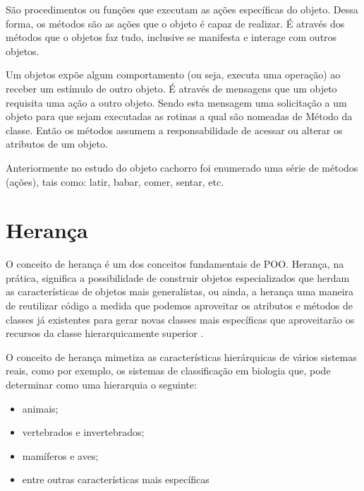 São procedimentos ou funções que executam as ações específicas do objeto. 
Dessa forma, os métodos são as ações que o objeto é capaz de realizar. É 
através dos métodos que o objetos faz tudo, inclusive se manifesta e 
interage com outros objetos.

Um objetos expõe algum comportamento (ou seja, executa uma operação) ao 
receber um estímulo de outro objeto. É através de mensagens que um objeto 
requisita uma ação a outro objeto. Sendo esta mensagem uma solicitação a um 
objeto para que sejam executadas as rotinas a qual são nomeadas de Método da 
classe. Então os métodos assumem a responsabilidade de acessar ou alterar os 
atributos de um objeto.

Anteriormente no estudo do objeto cachorro foi enumerado uma série de métodos 
(ações), tais como: latir, babar, comer, sentar, etc.

\section{Herança}

O conceito de herança é um dos conceitos fundamentais de POO. Herança, na prática, significa a possibilidade de construir objetos especializados que herdam as características de objetos mais generalistas, ou ainda, a herança uma maneira de reutilizar código a medida que podemos aproveitar os atributos e métodos de classes já existentes para gerar novas classes mais específicas que aproveitarão os recursos da classe hierarquicamente superior \cite{evandroeduardoseronruiz2008}.

O conceito de herança mimetiza as características hierárquicas de vários sistemas reais, como por exemplo, os sistemas de classificação em biologia que, pode determinar como uma hierarquia o seguinte:

\begin{itemize}
    \item animais;
    \item vertebrados e invertebrados;
    \item mamíferos e aves;
    \item entre outras características mais específicas
\end{itemize}


